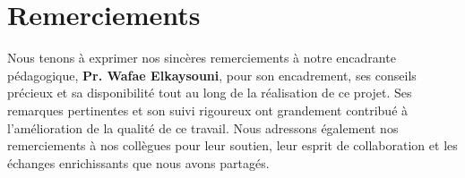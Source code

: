 \chapter*{Remerciements}
{Nous tenons à exprimer nos sincères remerciements à notre encadrante pédagogique, \textbf{Pr. Wafae Elkaysouni}, pour son encadrement, ses conseils précieux et sa disponibilité tout au long de la réalisation de ce projet. Ses remarques pertinentes et son suivi rigoureux ont grandement contribué à l’amélioration de la qualité de ce travail. 
Nous adressons également nos remerciements à nos collègues pour leur soutien, leur esprit de collaboration et les échanges enrichissants que nous avons partagés.}
